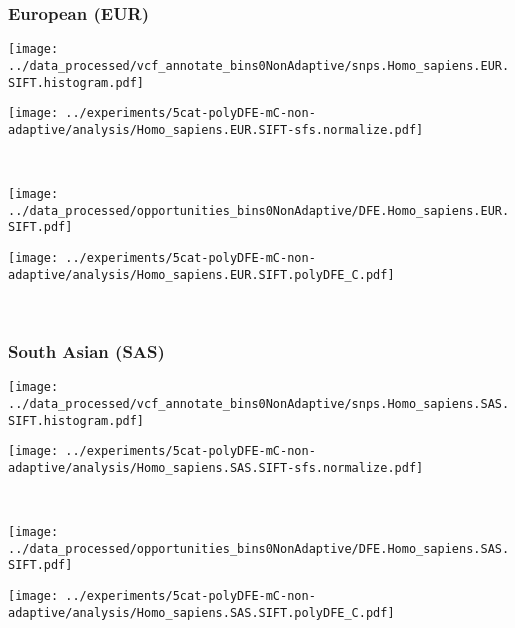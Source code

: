 \subsubsection{European (EUR)}

\begin{minipage}{0.49\linewidth}
    \texttt{[image: ../data\_processed/vcf\_annotate\_bins0NonAdaptive/snps.Homo\_sapiens.EUR.SIFT.histogram.pdf]}
\end{minipage}
\begin{minipage}{0.49\linewidth}
    \texttt{[image: ../experiments/5cat-polyDFE-mC-non-adaptive/analysis/Homo\_sapiens.EUR.SIFT-sfs.normalize.pdf]}
\end{minipage}
\\
\begin{minipage}{0.49\linewidth}
    \texttt{[image: ../data\_processed/opportunities\_bins0NonAdaptive/DFE.Homo\_sapiens.EUR.SIFT.pdf]}
\end{minipage}
\begin{minipage}{0.49\linewidth}
    \texttt{[image: ../experiments/5cat-polyDFE-mC-non-adaptive/analysis/Homo\_sapiens.EUR.SIFT.polyDFE\_C.pdf]}
\end{minipage}
\\

\subsubsection{South Asian (SAS)}

\begin{minipage}{0.49\linewidth}
    \texttt{[image: ../data\_processed/vcf\_annotate\_bins0NonAdaptive/snps.Homo\_sapiens.SAS.SIFT.histogram.pdf]}
\end{minipage}
\begin{minipage}{0.49\linewidth}
    \texttt{[image: ../experiments/5cat-polyDFE-mC-non-adaptive/analysis/Homo\_sapiens.SAS.SIFT-sfs.normalize.pdf]}
\end{minipage}
\\
\begin{minipage}{0.49\linewidth}
    \texttt{[image: ../data\_processed/opportunities\_bins0NonAdaptive/DFE.Homo\_sapiens.SAS.SIFT.pdf]}
\end{minipage}
\begin{minipage}{0.49\linewidth}
    \texttt{[image: ../experiments/5cat-polyDFE-mC-non-adaptive/analysis/Homo\_sapiens.SAS.SIFT.polyDFE\_C.pdf]}
\end{minipage}
\\

